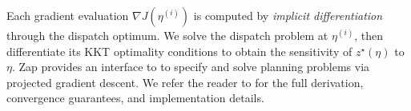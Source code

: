 Each gradient evaluation $\nabla J(\eta^{(i)})$ is computed by \emph{implicit differentiation} through the dispatch optimum. We solve the dispatch problem at $\eta^{(i)}$, then differentiate its KKT optimality conditions to obtain the sensitivity of $z^\star(\eta)$ to $\eta$. Zap provides an interface to to specify and solve planning problems via projected gradient descent. We refer the reader to \cite{degleris2024gradient} for the full derivation, convergence guarantees, and implementation details. 











